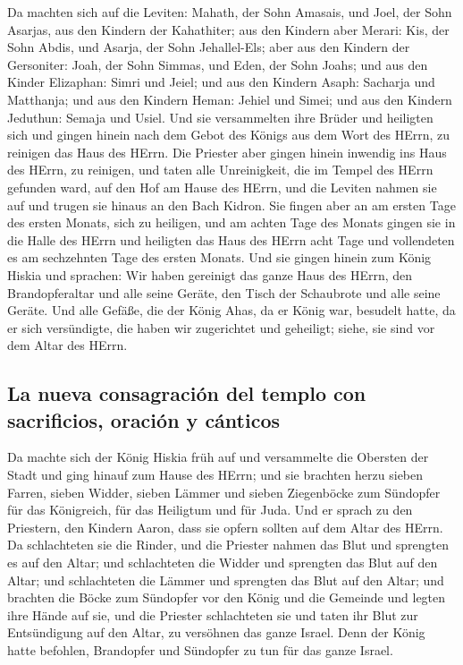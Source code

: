  Da machten sich auf die Leviten: Mahath, der Sohn
Amasais, und Joel, der Sohn Asarjas, aus den Kindern der Kahathiter; aus
den Kindern aber Merari: Kis, der Sohn Abdis, und Asarja, der Sohn
Jehallel-Els; aber aus den Kindern der Gersoniter: Joah, der Sohn
Simmas, und Eden, der Sohn Joahs;  und aus den Kinder
Elizaphan: Simri und Jeiel; und aus den Kindern Asaph: Sacharja und
Matthanja;  und aus den Kindern Heman: Jehiel und Simei;
und aus den Kindern Jeduthun: Semaja und Usiel.  Und sie
versammelten ihre Brüder und heiligten sich und gingen hinein nach dem
Gebot des Königs aus dem Wort des HErrn, zu reinigen das Haus des HErrn.
 Die Priester aber gingen hinein inwendig ins Haus des
HErrn, zu reinigen, und taten alle Unreinigkeit, die im Tempel des HErrn
gefunden ward, auf den Hof am Hause des HErrn, und die Leviten nahmen
sie auf und trugen sie hinaus an den Bach Kidron.  Sie
fingen aber an am ersten Tage des ersten Monats, sich zu heiligen, und
am achten Tage des Monats gingen sie in die Halle des HErrn und
heiligten das Haus des HErrn acht Tage und vollendeten es am sechzehnten
Tage des ersten Monats.  Und sie gingen hinein zum König
Hiskia und sprachen: Wir haben gereinigt das ganze Haus des HErrn, den
Brandopferaltar und alle seine Geräte, den Tisch der Schaubrote und alle
seine Geräte.  Und alle Gefäße, die der König Ahas, da er
König war, besudelt hatte, da er sich versündigte, die haben wir
zugerichtet und geheiligt; siehe, sie sind vor dem Altar des HErrn.

\hypertarget{la-nueva-consagraciuxf3n-del-templo-con-sacrificios-oraciuxf3n-y-cuxe1nticos}{%
\subsection{La nueva consagración del templo con sacrificios, oración y
cánticos}\label{la-nueva-consagraciuxf3n-del-templo-con-sacrificios-oraciuxf3n-y-cuxe1nticos}}

 Da machte sich der König Hiskia früh auf und versammelte
die Obersten der Stadt und ging hinauf zum Hause des HErrn;
 und sie brachten herzu sieben Farren, sieben Widder,
sieben Lämmer und sieben Ziegenböcke zum Sündopfer für das Königreich,
für das Heiligtum und für Juda. Und er sprach zu den Priestern, den
Kindern Aaron, dass sie opfern sollten auf dem Altar des HErrn.
 Da schlachteten sie die Rinder, und die Priester nahmen
das Blut und sprengten es auf den Altar; und schlachteten die Widder und
sprengten das Blut auf den Altar; und schlachteten die Lämmer und
sprengten das Blut auf den Altar;  und brachten die Böcke
zum Sündopfer vor den König und die Gemeinde und legten ihre Hände auf
sie,  und die Priester schlachteten sie und taten ihr
Blut zur Entsündigung auf den Altar, zu versöhnen das ganze Israel. Denn
der König hatte befohlen, Brandopfer und Sündopfer zu tun für das ganze
Israel.

